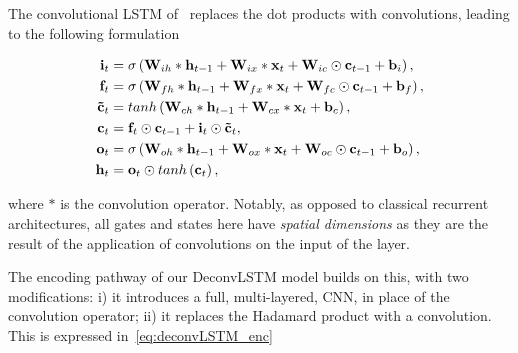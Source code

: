 The convolutional LSTM of~\citep{ShiCWYWW15} replaces the dot products with
convolutions, leading to the following formulation

\begin{equation}
\begin{split}
    \mathbf{i}_t &= \sigma\left(
        \mathbf{W}_{ih} * \mathbf{h}_{t-1} +
        \mathbf{W}_{ix} * \mathbf{x}_t +
        \mathbf{W}_{ic} \odot \mathbf{c}_{t-1} +
        \mathbf{b}_i \right),\\
    \mathbf{f}_t &= \sigma\left(
        \mathbf{W}_{fh} * \mathbf{h}_{t-1} +
        \mathbf{W}_{fx} * \mathbf{x}_t +
        \mathbf{W}_{fc} \odot \mathbf{c}_{t-1} +
        \mathbf{b}_f \right),\\
    \mathbf{\tilde c}_t &= tanh \left(
        \mathbf{W}_{ch} * \mathbf{h}_{t-1} +
        \mathbf{W}_{cx} * \mathbf{x}_t +
        \mathbf{b}_c \right),\\
    \mathbf{c}_t &= \mathbf{f}_t \odot \mathbf{c}_{t-1} + \mathbf{i}_t
        \odot \mathbf{\tilde c}_t,\\
    \mathbf{o}_t &= \sigma\left(
        \mathbf{W}_{oh} * \mathbf{h}_{t-1} +
        \mathbf{W}_{ox} * \mathbf{x}_t +
        \mathbf{W}_{oc} \odot \mathbf{c}_{t-1} +
        \mathbf{b}_o \right),\\
    \mathbf{h}_t &= \mathbf{o}_t \odot tanh \left(\mathbf{c}_t\right),
\end{split}
\end{equation}

\noindent where $*$ is the convolution operator. Notably, as opposed to
classical recurrent architectures, all gates and states here have \emph{spatial
dimensions} as they are the result of the application of convolutions on the
input of the layer.

The encoding pathway of our DeconvLSTM model builds on this, with two
modifications: i) it introduces a full, multi-layered, CNN, in place of the
convolution operator; ii) it replaces the Hadamard product with a convolution.
This is expressed in~\autoref{eq:deconvLSTM_enc}


